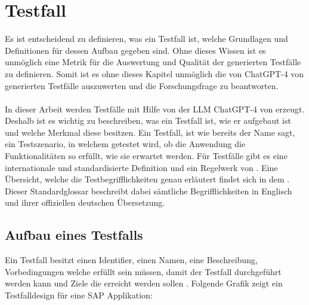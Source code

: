 \documentclass[12pt,toc=bib,toc=listof]{scrreprt}
\begin{document}
\section{Testfall} %
\label{sec:testfall}
Es ist entscheidend zu definieren, was ein Testfall ist, welche Grundlagen und Definitionen für dessen Aufbau gegeben sind. Ohne dieses Wissen ist es unmöglich eine Metrik für die Auswertung und Qualität der generierten Testfälle zu definieren. Somit ist es ohne dieses Kapitel unmöglich die von ChatGPT-4 von \textcite{OpenAI2025} generierten Testfälle auszuwerten und die Forschungsfrage zu beantworten.\\
\\
In dieser Arbeit werden Testfälle mit Hilfe von der LLM ChatGPT-4 von \textcite{OpenAI2025} erzeugt. Deshalb ist es wichtig zu beschreiben, was ein Testfall ist, wie er aufgebaut ist und welche Merkmal diese besitzen. Ein Testfall, ist wie bereits der Name sagt, ein Testszenario, in welchem getestet wird, ob die Anwendung die Funktionalitäten so erfüllt, wie sie erwartet werden. Für Testfälle gibt es eine internationale und standardisierte Definition und ein Regelwerk von \textcite{IsoIecIeee2024}. Eine Übersicht, welche die Testbegrifflichkeiten genau erläutert findet sich in dem \textcite{Istqb2017}. Dieser Standardglossar beschreibt dabei sämtliche Begrifflichkeiten in Englisch und ihrer offiziellen deutschen Übersetzung.

\subsection{Aufbau eines Testfalls} %
\label{sec:aufbauEinesTestfalls}
Ein Testfall besitzt einen Identifier, einen Namen, eine Beschreibung, Vorbedingungen welche erfüllt sein müssen, damit der Testfall durchgeführt werden kann und Ziele die erreicht werden sollen \textcite{IsoIecIeee2024}. Folgende Grafik zeigt ein Testfalldesign für eine SAP Applikation:
\end{document}
